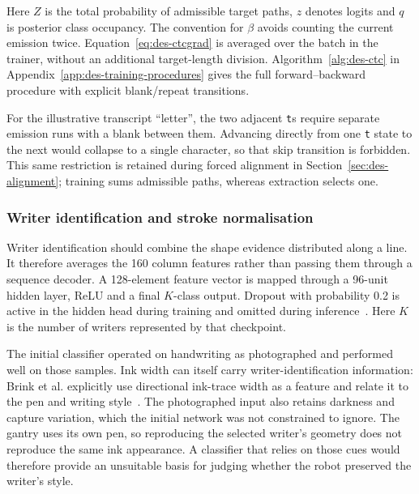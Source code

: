 Here $Z$ is the total probability of admissible target paths, $z$ denotes logits and $q$ is posterior class occupancy. The convention for $\beta$ avoids counting the current emission twice. Equation~\ref{eq:des-ctcgrad} is averaged over the batch in the trainer, without an additional target-length division.
Algorithm~\ref{alg:des-ctc} in Appendix~\ref{app:des-training-procedures} gives the full forward--backward procedure with explicit blank/repeat transitions.


For the illustrative transcript ``letter'', the two adjacent \texttt{t}s require separate emission runs with a blank between them. Advancing directly from one \texttt{t} state to the next would collapse to a single character, so that skip transition is forbidden. This same restriction is retained during forced alignment in Section~\ref{sec:des-alignment}; training sums admissible paths, whereas extraction selects one.

\subsubsection{Writer identification and stroke normalisation}
\label{sec:des-shapenamer}
Writer identification should combine the shape evidence distributed along a line. It therefore averages the 160 column features rather than passing them through a sequence decoder. A 128-element feature vector is mapped through a 96-unit hidden layer, ReLU and a final $K$-class output. Dropout with probability 0.2 is active in the hidden head during training and omitted during inference~\cite[pp.~1931, 1934]{srivastava2014}. Here $K$ is the number of writers represented by that checkpoint.

The initial classifier operated on handwriting as photographed and performed well on those samples. Ink width can itself carry writer-identification information: Brink et al. explicitly use directional ink-trace width as a feature and relate it to the pen and writing style~\cite[p.~162]{brink2012}. The photographed input also retains darkness and capture variation, which the initial network was not constrained to ignore. The gantry uses its own pen, so reproducing the selected writer's geometry does not reproduce the same ink appearance. A classifier that relies on those cues would therefore provide an unsuitable basis for judging whether the robot preserved the writer's style.

